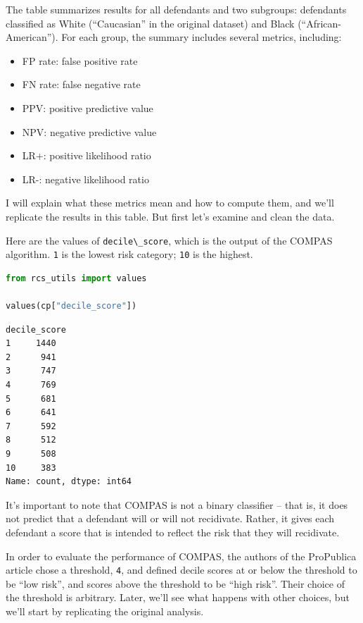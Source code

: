 The table summarizes results for all defendants and two subgroups:
defendants classified as White (``Caucasian'' in the original dataset)
and Black (``African-American''). For each group, the summary includes
several metrics, including:

\begin{itemize}

\item
  FP rate: false positive rate
\item
  FN rate: false negative rate
\item
  PPV: positive predictive value
\item
  NPV: negative predictive value
\item
  LR+: positive likelihood ratio
\item
  LR-: negative likelihood ratio
\end{itemize}

I will explain what these metrics mean and how to compute them, and
we'll replicate the results in this table. But first let's examine and
clean the data.

Here are the values of \passthrough{\lstinline!decile\_score!}, which is
the output of the COMPAS algorithm. \passthrough{\lstinline!1!} is the
lowest risk category; \passthrough{\lstinline!10!} is the highest.

\begin{lstlisting}[language=Python,style=source]
from rcs_utils import values

values(cp["decile_score"])
\end{lstlisting}

\begin{lstlisting}[style=output]
decile_score
1     1440
2      941
3      747
4      769
5      681
6      641
7      592
8      512
9      508
10     383
Name: count, dtype: int64
\end{lstlisting}

It's important to note that COMPAS is not a binary classifier -- that
is, it does not predict that a defendant will or will not recidivate.
Rather, it gives each defendant a score that is intended to reflect the
risk that they will recidivate.

In order to evaluate the performance of COMPAS, the authors of the
ProPublica article chose a threshold, \passthrough{\lstinline!4!}, and
defined decile scores at or below the threshold to be ``low risk'', and
scores above the threshold to be ``high risk''. Their choice of the
threshold is arbitrary. Later, we'll see what happens with other
choices, but we'll start by replicating the original analysis.

